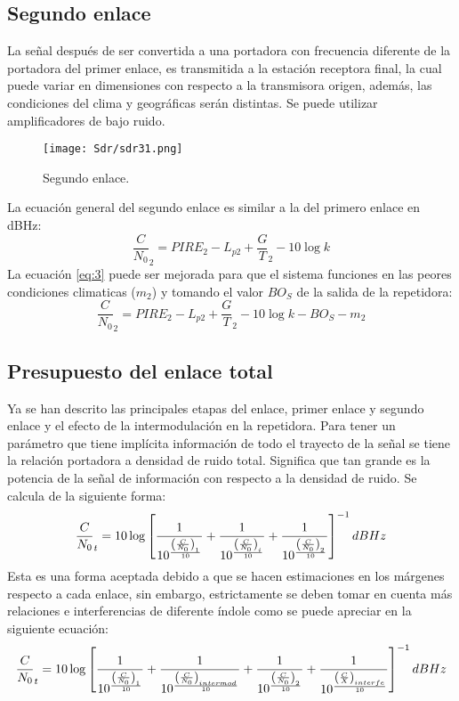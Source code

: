 \documentclass[
	12pt, %
	fleqn, %
	a4paper, %
	oneside, %
]{LegrandOrangeBook}
\begin{document}
\subsection{Segundo enlace}
La señal después de ser convertida a una portadora con frecuencia diferente de la portadora del primer enlace, es transmitida a la estación receptora final, la cual puede variar en dimensiones con respecto a la transmisora origen, además, las condiciones del clima y geográficas serán distintas. Se puede utilizar amplificadores de bajo ruido.
\begin{figure}[H]
\centering
\texttt{[image: Sdr/sdr31.png]}
\caption{Segundo enlace.}
\end{figure}
La ecuación general del segundo enlace es similar a la del primero enlace en dBHz:
\begin{equation}
\frac{C}{N_0}_2=PIRE_2-L_{p2}+\frac{G}{T}_2-10\log k
\label{eq:3}
\end{equation}
La ecuación \ref{eq:3} puede ser mejorada para que el sistema funciones en las peores condiciones climaticas ($m_2$) y tomando el valor $BO_S$ de la salida de la repetidora:
\begin{equation}
\frac{C}{N_0}_2=PIRE_2-L_{p2}+\frac{G}{T}_2-10\log k-BO_S-m_2
\end{equation}
\subsection{Presupuesto del enlace total}
Ya se han descrito las principales etapas del enlace, primer enlace y segundo enlace y el efecto de la intermodulación en la repetidora. Para tener un parámetro que tiene implícita información de todo el trayecto de la señal se tiene la relación portadora a densidad de ruido total. Significa que tan grande es la potencia de la señal de información con respecto a la densidad de ruido. Se calcula de la siguiente forma:
\begin{equation}
\frac{C}{N_0}_t=10\log\left[\frac{1}{10^{\frac{\left(\frac{C}{N_0}\right)_1}{10}}}+\frac{1}{10^{\frac{\left(\frac{C}{N_0}\right)_i}{10}}}+\frac{1}{10^{\frac{\left(\frac{C}{N_0}\right)_2}{10}}}\right]^{-1} dBHz
\label{eq:portadora ruido total}
\end{equation}
Esta es una forma aceptada debido a que se hacen estimaciones en los márgenes respecto a cada enlace, sin embargo, estrictamente se deben tomar en cuenta más relaciones e interferencias de diferente índole como se puede apreciar en la siguiente ecuación:
\begin{equation}
\frac{C}{N_0}_t=10\log\left[\frac{1}{10^{\frac{\left(\frac{C}{N_0}\right)_1}{10}}}+\frac{1}{10^{\frac{\left(\frac{C}{N_0}\right)_{intermod}}{10}}}+\frac{1}{10^{\frac{\left(\frac{C}{N_0}\right)_2}{10}}}+\frac{1}{10^{\frac{\left(\frac{C}{X}\right)_{interfe}}{10}}}\right]^{-1} dBHz
\end{equation}
\end{document}
